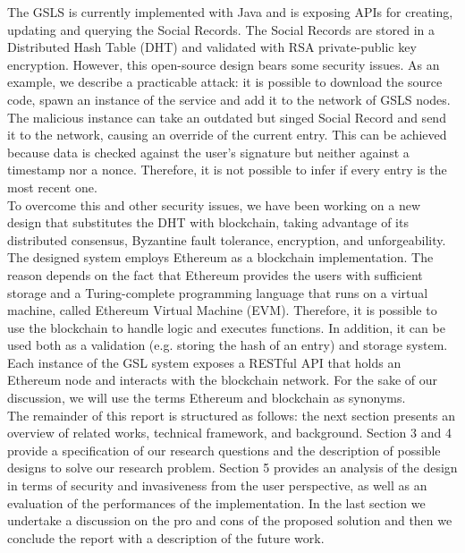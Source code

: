 The GSLS is currently implemented with Java and is exposing APIs for creating, updating and querying the Social Records. The Social Records are stored in a Distributed Hash Table (DHT) and validated with RSA private-public key encryption. However, this open-source design bears some security issues. As an example, we describe a practicable attack: it is possible to download the source code, spawn an instance of the service and add it to the network of GSLS nodes. The malicious instance can take an outdated but singed Social Record and send it to the network, causing an override of the current entry. This can be achieved because data is checked against the user’s signature but neither against a timestamp nor a nonce. Therefore, it is not possible to infer if every entry is the most recent one. 
\\

To overcome this and other security issues, we have been working on a new design that substitutes the DHT with blockchain, taking advantage of its distributed consensus, Byzantine fault tolerance, encryption, and unforgeability. The designed system employs Ethereum as a blockchain implementation. The reason depends on the fact that Ethereum provides the users with sufficient storage and a Turing-complete programming language that runs on a virtual machine, called Ethereum Virtual Machine (EVM). Therefore, it is possible to use the blockchain to handle logic and executes functions. In addition, it can be used both as a validation (e.g. storing the hash of an entry) and storage system. 
\\

Each instance of the GSL system exposes a RESTful API that holds an Ethereum node and interacts with the blockchain network. For the sake of our discussion, we will use the terms Ethereum and blockchain as synonyms.
\\

The remainder of this report is structured as follows: the next section presents an overview of related works, technical framework, and background. Section 3 and 4 provide a specification of our research questions and the description of possible designs to solve our research problem. Section 5 provides an analysis of the design in terms of security and invasiveness from the user perspective, as well as an evaluation of the performances of the implementation. In the last section we undertake a discussion on the pro and cons of the proposed solution and then we conclude the report with a description of the future work. 
